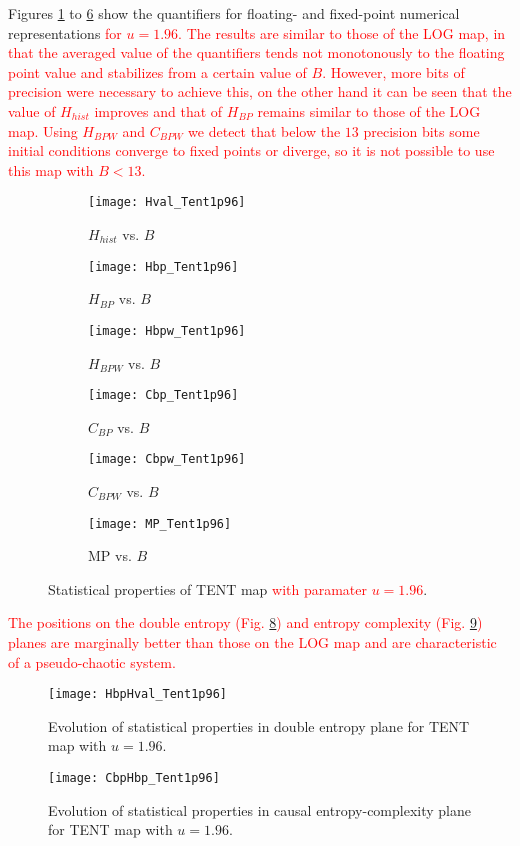 Figures \ref{fig:Hval_Tent} to \ref{fig:MP_Tent} show the quantifiers for floating- and fixed-point numerical representations \textcolor{red}{for $u=1.96$.}
\textcolor{red}{The results are similar to those of the LOG map, in that the averaged value of the quantifiers tends not monotonously to the floating point value and stabilizes from a certain value of $B$.
However, more bits of precision were necessary to achieve this, on the other hand it can be seen that the value of $H_ {hist}$ improves and that of $H_ {BP}$ remains similar to those of the LOG map.
Using $H_ {BPW}$ and $C_ {BPW}$ we detect that below the $13$ precision bits some initial conditions converge to fixed points or diverge, so it is not possible to use this map with $B <13$.}
%
\begin{figure}[H]
	\centering
	\begin{subfigure}[b]{0.49\textwidth}
		\texttt{[image: Hval\_Tent1p96]}
		\caption{$H_{hist}$ vs. $B$}
		\label{fig:Hval_Tent}
	\end{subfigure}
	\begin{subfigure}[b]{0.49\textwidth}
		\texttt{[image: Hbp\_Tent1p96]}
		\caption{$H_{BP}$ vs. $B$}
		\label{fig:Hbp_Tent}
	\end{subfigure}
	\begin{subfigure}[b]{0.49\textwidth}
		\texttt{[image: Hbpw\_Tent1p96]}
		\caption{$H_{BPW}$ vs. $B$}
		\label{fig:Hbpw_Tent}
	\end{subfigure}
	\begin{subfigure}[b]{0.49\textwidth}
		\texttt{[image: Cbp\_Tent1p96]}
		\caption{$C_{BP}$ vs. $B$}
		\label{fig:Cbp_Tent}
	\end{subfigure}
	\begin{subfigure}[b]{0.49\textwidth}
		\texttt{[image: Cbpw\_Tent1p96]}
		\caption{$C_{BPW}$ vs. $B$}
		\label{fig:Cbpw_Tent}
	\end{subfigure}
	\begin{subfigure}[b]{0.49\textwidth}
		\texttt{[image: MP\_Tent1p96]}
		\caption{MP vs. $B$}
		\label{fig:MP_Tent}
	\end{subfigure}
	\caption{Statistical properties of TENT map \textcolor{red}{with paramater $u=1.96$}.}
	\label{fig:TENT_QuantiB}
\end{figure}

\textcolor{red}{The positions on the double entropy (Fig. \ref{fig:TENT1p96_HH}) and entropy complexity (Fig. \ref{fig:TENT1p96_HbpCbp}) planes are marginally better than those on the LOG map and are characteristic of a pseudo-chaotic system.}
%
\begin{figure}[H]
	\centering
	\texttt{[image: HbpHval\_Tent1p96]}
	\caption{Evolution of statistical properties in double entropy plane for TENT map with $u=1.96$.}
	\label{fig:TENT1p96_HH}
\end{figure}
%
\begin{figure}[H]
	\centering
	\texttt{[image: CbpHbp\_Tent1p96]}
	\caption{$H_{BP} \times C_{BP}$}
	\caption{Evolution of statistical properties in causal entropy-complexity plane for TENT map with $u=1.96$.}
	\label{fig:TENT1p96_HbpCbp}
\end{figure}